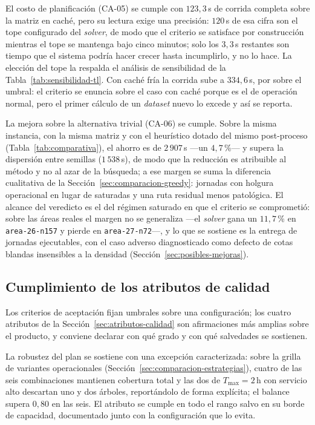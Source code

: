 El costo de planificación (CA-05) se cumple con $123{,}3$\,s de corrida completa sobre la matriz en
caché, pero su lectura exige una precisión: $120$\,s de esa cifra son el tope configurado del
\textit{solver}, de modo que el criterio se satisface por construcción mientras el tope se mantenga
bajo cinco minutos; solo los $3{,}3$\,s restantes son tiempo que el sistema podría hacer crecer
hasta incumplirlo, y no lo hace. La elección del tope la respalda el análisis de sensibilidad de la
Tabla~\ref{tab:sensibilidad-tl}. Con caché fría la corrida sube a $334{,}6$\,s, por
sobre el umbral: el criterio se enuncia sobre el caso con caché porque es el de operación normal,
pero el primer cálculo de un \textit{dataset} nuevo lo excede y así se reporta.

La mejora sobre la alternativa trivial (CA-06) se cumple. Sobre la misma instancia, con la misma
matriz y con el heurístico dotado del mismo post-proceso (Tabla~\ref{tab:comparativa}), el ahorro
es de $2\,907$\,s ---un $4{,}7$\,\%--- y supera la dispersión entre semillas ($1\,538$\,s), de modo
que la reducción es atribuible al método y no al azar de la búsqueda; a ese margen se suma la
diferencia cualitativa de la Sección~\ref{sec:comparacion-greedy}: jornadas con holgura operacional
en lugar de saturadas y una ruta residual menos patológica. El alcance del veredicto es el del
régimen saturado en que el criterio se comprometió: sobre las áreas reales el margen no se
generaliza ---el \textit{solver} gana un $11{,}7$\,\% en \texttt{area-26-n157} y pierde en
\texttt{area-27-n72}---, y lo que se sostiene es la entrega de jornadas ejecutables, con el caso
adverso diagnosticado como defecto de cotas blandas insensibles a la densidad
(Sección~\ref{sec:posibles-mejoras}).

\subsection{Cumplimiento de los atributos de calidad}
\label{sec:cumplimiento-atributos}

Los criterios de aceptación fijan umbrales sobre una configuración; los cuatro atributos de la
Sección~\ref{sec:atributos-calidad} son afirmaciones más amplias sobre el producto, y conviene
declarar con qué grado y con qué salvedades se sostienen.

La robustez del plan se sostiene con una excepción caracterizada: sobre la grilla de variantes
operacionales (Sección~\ref{sec:comparacion-estrategias}), cuatro de las seis combinaciones
mantienen
cobertura total y las dos de $T_{\max}=2$\,h con servicio alto descartan uno y dos árboles,
reportándolo de forma explícita; el balance supera $0{,}80$ en las seis. El atributo se cumple en
todo el rango salvo en su borde de capacidad, documentado junto con la configuración que lo evita.


